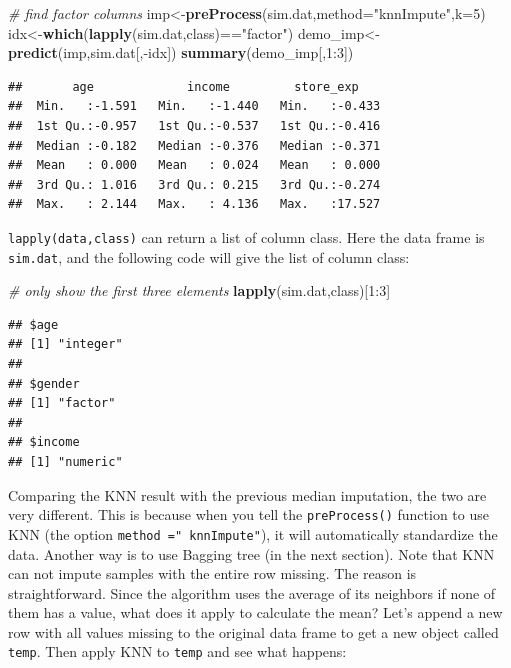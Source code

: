 \documentclass[12pt,]{krantz}
\newenvironment{Shaded}{\begin{snugshade}}{\end{snugshade}}
\newcommand{\KeywordTok}[1]{\textcolor[rgb]{0.13,0.29,0.53}{\textbf{{#1}}}}
\newcommand{\DataTypeTok}[1]{\textcolor[rgb]{0.13,0.29,0.53}{{#1}}}
\newcommand{\DecValTok}[1]{\textcolor[rgb]{0.00,0.00,0.81}{{#1}}}
\newcommand{\StringTok}[1]{\textcolor[rgb]{0.31,0.60,0.02}{{#1}}}
\newcommand{\CommentTok}[1]{\textcolor[rgb]{0.56,0.35,0.01}{\textit{{#1}}}}
\newcommand{\NormalTok}[1]{{#1}}
\theoremstyle{definition}
\theoremstyle{definition}
\theoremstyle{remark}
\begin{document}
\begin{Shaded}
\begin{Highlighting}[]
\CommentTok{# find factor columns}
\NormalTok{imp<-}\KeywordTok{preProcess}\NormalTok{(sim.dat,}\DataTypeTok{method=}\StringTok{"knnImpute"}\NormalTok{,}\DataTypeTok{k=}\DecValTok{5}\NormalTok{)}
\NormalTok{idx<-}\KeywordTok{which}\NormalTok{(}\KeywordTok{lapply}\NormalTok{(sim.dat,class)==}\StringTok{"factor"}\NormalTok{)}
\NormalTok{demo_imp<-}\KeywordTok{predict}\NormalTok{(imp,sim.dat[,-idx])}
\KeywordTok{summary}\NormalTok{(demo_imp[,}\DecValTok{1}\NormalTok{:}\DecValTok{3}\NormalTok{])}
\end{Highlighting}
\end{Shaded}

\begin{verbatim}
##       age             income         store_exp     
##  Min.   :-1.591   Min.   :-1.440   Min.   :-0.433  
##  1st Qu.:-0.957   1st Qu.:-0.537   1st Qu.:-0.416  
##  Median :-0.182   Median :-0.376   Median :-0.371  
##  Mean   : 0.000   Mean   : 0.024   Mean   : 0.000  
##  3rd Qu.: 1.016   3rd Qu.: 0.215   3rd Qu.:-0.274  
##  Max.   : 2.144   Max.   : 4.136   Max.   :17.527
\end{verbatim}

\texttt{lapply(data,class)} can return a list of column class. Here the
data frame is \texttt{sim.dat}, and the following code will give the
list of column class:

\begin{Shaded}
\begin{Highlighting}[]
\CommentTok{# only show the first three elements}
\KeywordTok{lapply}\NormalTok{(sim.dat,class)[}\DecValTok{1}\NormalTok{:}\DecValTok{3}\NormalTok{]}
\end{Highlighting}
\end{Shaded}

\begin{verbatim}
## $age
## [1] "integer"
## 
## $gender
## [1] "factor"
## 
## $income
## [1] "numeric"
\end{verbatim}

Comparing the KNN result with the previous median imputation, the two
are very different. This is because when you tell the
\texttt{preProcess()} function to use KNN (the option
\texttt{method\ ="\ knnImpute"}), it will automatically standardize the
data. Another way is to use Bagging tree (in the next section). Note
that KNN can not impute samples with the entire row missing. The reason
is straightforward. Since the algorithm uses the average of its
neighbors if none of them has a value, what does it apply to calculate
the mean? Let's append a new row with all values missing to the original
data frame to get a new object called \texttt{temp}. Then apply KNN to
\texttt{temp} and see what happens:
\end{document}
